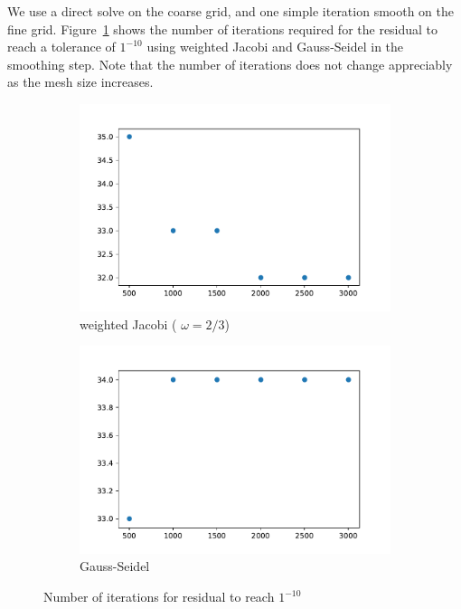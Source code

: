 \documentclass[10pt]{article}
\begin{document}
\begin{solution}[Solution]
We use a direct solve on the coarse grid, and one simple iteration smooth on the fine grid. Figure~\ref{mg} shows the number of iterations required for the residual to reach a tolerance of \( 1^{-10} \) using weighted Jacobi and Gauss-Seidel in the smoothing step. Note that the number of iterations does not change appreciably as the mesh size increases. 
\begin{figure}[H]\centering
    \begin{subfigure}{.48\textwidth}
        \includegraphics[width=\textwidth]{img/multigrid_j_1.pdf}
        \caption{weighted Jacobi ( \( \omega = 2/3 \))}
    \end{subfigure}
    \begin{subfigure}{.48\textwidth}
        \includegraphics[width=\textwidth]{img/multigrid_gs_1.pdf}
        \caption{Gauss-Seidel}
    \end{subfigure}
    \caption{Number of iterations for residual to reach \( 1^{-10} \)}
\label{mg}
\end{figure}

\end{solution}
\end{document}
